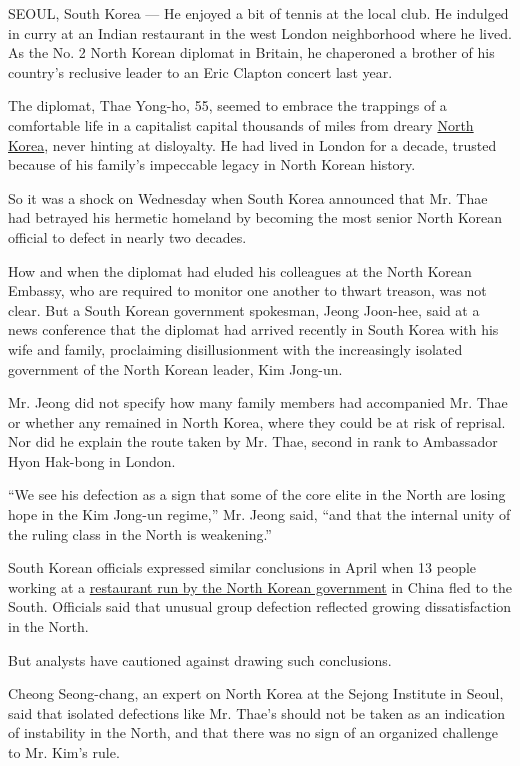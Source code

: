 SEOUL, South Korea --- He enjoyed a bit of tennis at the local club. He
indulged in curry at an Indian restaurant in the west London
neighborhood where he lived. As the No. 2 North Korean diplomat in
Britain, he chaperoned a brother of his country's reclusive leader to an
Eric Clapton concert last year.

The diplomat, Thae Yong-ho, 55, seemed to embrace the trappings of a
comfortable life in a capitalist capital thousands of miles from dreary
\href{http://topics.nytimes.com/top/news/international/countriesandterritories/northkorea/index.html?inline=nyt-geo}{North
Korea}, never hinting at disloyalty. He had lived in London for a
decade, trusted because of his family's impeccable legacy in North
Korean history.

So it was a shock on Wednesday when South Korea announced that Mr. Thae
had betrayed his hermetic homeland by becoming the most senior North
Korean official to defect in nearly two decades.

How and when the diplomat had eluded his colleagues at the North Korean
Embassy, who are required to monitor one another to thwart treason, was
not clear. But a South Korean government spokesman, Jeong Joon-hee, said
at a news conference that the diplomat had arrived recently in South
Korea with his wife and family, proclaiming disillusionment with the
increasingly isolated government of the North Korean leader, Kim
Jong-un.

Mr. Jeong did not specify how many family members had accompanied Mr.
Thae or whether any remained in North Korea, where they could be at risk
of reprisal. Nor did he explain the route taken by Mr. Thae, second in
rank to Ambassador Hyon Hak-bong in London.

``We see his defection as a sign that some of the core elite in the
North are losing hope in the Kim Jong-un regime,'' Mr. Jeong said, ``and
that the internal unity of the ruling class in the North is weakening.''

South Korean officials expressed similar conclusions in April when 13
people working at a
\href{http://www.nytimes.com/2016/04/09/world/asia/north-korean-defectors-restaurant-south-korea.html}{restaurant
run by the North Korean government} in China fled to the South.
Officials said that unusual group defection reflected growing
dissatisfaction in the North.

But analysts have cautioned against drawing such conclusions.

Cheong Seong-chang, an expert on North Korea at the Sejong Institute in
Seoul, said that isolated defections like Mr. Thae's should not be taken
as an indication of instability in the North, and that there was no sign
of an organized challenge to Mr. Kim's rule.

